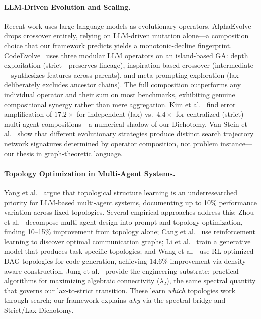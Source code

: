 \documentclass[sigconf,anonymous]{acmart}
\begin{document}
\paragraph{LLM-Driven Evolution and Scaling.}
Recent work uses large language models as evolutionary operators.
AlphaEvolve~\cite{alphaevolve2026marl} drops crossover entirely, relying on LLM-driven mutation alone---a composition choice that our framework predicts yields a monotonic-decline fingerprint.
CodeEvolve~\cite{assumpcao2025codeevolve} uses three modular LLM operators on an island-based GA: depth exploitation (strict---preserves lineage), inspiration-based crossover (intermediate---synthesizes features across parents), and meta-prompting exploration (lax---deliberately excludes ancestor chains). The full composition outperforms any individual operator and their sum on most benchmarks, exhibiting genuine compositional synergy rather than mere aggregation.
Kim et al.~\cite{kim2025scaling} find error amplification of $17.2\times$ for independent (lax) vs.\ $4.4\times$ for centralized (strict) multi-agent compositions---a numerical shadow of our Dichotomy.
Van Stein et al.~\cite{vanstein2025code} show that different evolutionary strategies produce distinct search trajectory network signatures determined by operator composition, not problem instance---our thesis in graph-theoretic language.

\paragraph{Topology Optimization in Multi-Agent Systems.}
Yang et al.~\cite{yang2025topology} argue that topological structure learning is an underresearched priority for LLM-based multi-agent systems, documenting up to 10\% performance variation across fixed topologies. Several empirical approaches address this: Zhou et al.~\cite{zhou2025mass} decompose multi-agent design into prompt and topology optimization, finding 10--15\% improvement from topology alone; Cang et al.~\cite{cang2026graphgrpo} use reinforcement learning to discover optimal communication graphs; Li et al.~\cite{li2026ofamas} train a generative model that produces task-specific topologies; and Wang et al.~\cite{wang2026agentconductor} use RL-optimized DAG topologies for code generation, achieving 14.6\% improvement via density-aware construction. Jung et al.~\cite{jung2025mac} provide the engineering substrate: practical algorithms for maximizing algebraic connectivity ($\lambda_2$), the same spectral quantity that governs our lax-to-strict transition. These learn \emph{which} topologies work through search; our framework explains \emph{why} via the spectral bridge and Strict/Lax Dichotomy.
\end{document}

